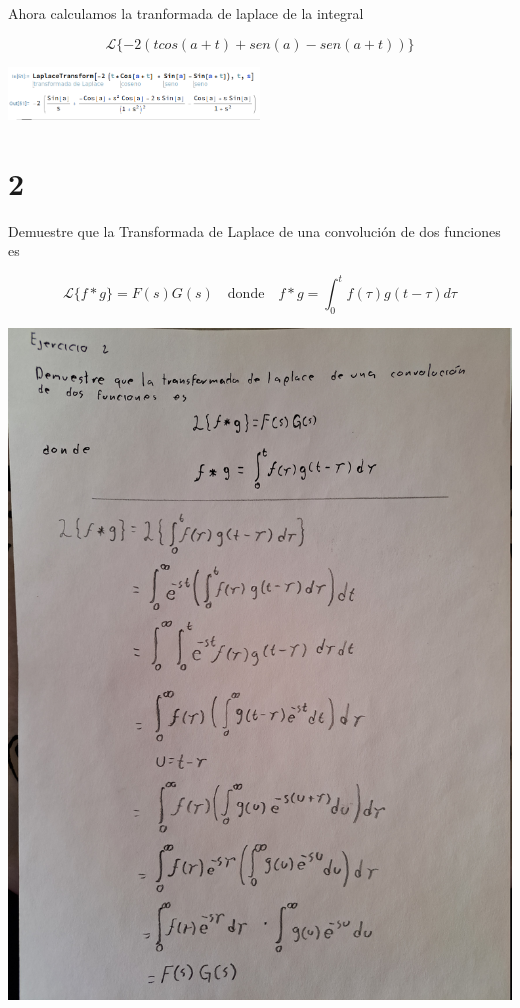 \documentclass{article}
\begin{document}
Ahora calculamos la tranformada de laplace de la integral

\[
    \mathcal{L}\{-2(t cos(a+t) + sen(a) -sen(a+t))\}
\]
\begin{center}
    \includegraphics[width=0.5\textwidth]{./image8.png}
\end{center}

\newpage
\section{2}
Demuestre que la Transformada de Laplace de una convolución de dos funciones es

\[
    \mathcal{L} \{ f*g \} = F(s)G(s) \quad \text{donde} \quad f*g = \int_{0}^{t} f(\tau) g(t - \tau) d\tau
\]

\begin{center}
    \includegraphics[width=\textwidth]{./ejercicio2.jpg}
\end{center}
\end{document}
